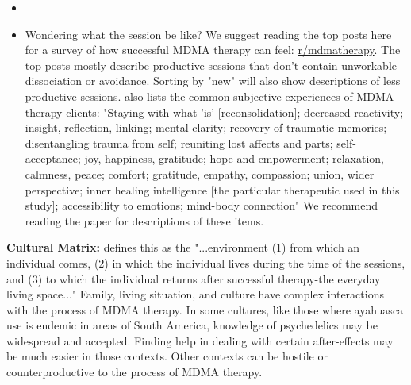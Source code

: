 \documentclass[12pt,letterpaper]{book}
\begin{document}
\begin{itemize}
    \item {}
    \item Wondering what the session be like? We suggest reading the top posts here for a survey of how successful MDMA therapy can feel: \href{https://old.reddit.com/r/mdmatherapy/top/?sort=top&t=all}{r/mdmatherapy}. The top posts mostly describe productive sessions that don't contain unworkable dissociation or avoidance. Sorting by "new" will also show descriptions of less productive sessions. \textcite{godes2023perceived} also lists the common subjective experiences of MDMA-therapy clients: "Staying with what 'is' [reconsolidation]; decreased reactivity; insight, reflection, linking; mental clarity; recovery of traumatic memories; disentangling trauma from self; reuniting lost affects and parts; self-acceptance; joy, happiness, gratitude; hope and empowerment; relaxation, calmness, peace; comfort; gratitude, empathy, compassion; union, wider perspective; inner healing intelligence [the particular therapeutic used in this study]; accessibility to emotions; mind-body connection" We recommend reading the paper for descriptions of these items.
\end{itemize}
\noindent \textbf{Cultural Matrix:} \textcite{setSettingMatrix} defines this as the "...environment (1) from which an individual comes, (2) in which the individual lives during the time of the sessions, and (3) to which the individual returns after successful therapy-the everyday living space..." Family, living situation, and culture have complex interactions with the process of MDMA therapy. In some cultures, like those where ayahuasca use is endemic in areas of South America, knowledge of psychedelics may be widespread and accepted. Finding help in dealing with certain after-effects may be much easier in those contexts. Other contexts can be hostile or counterproductive to the process of MDMA therapy. 

\vspace{\baselineskip}
\end{document}
